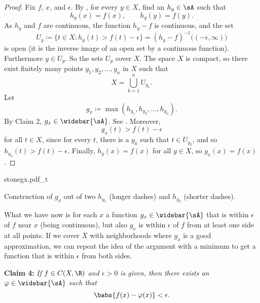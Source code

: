\begin{proof}
Fix $f$, $x$, and $\epsilon$.
By , for every $y \in X$, find an $h_y \in
\sA$ such that
\begin{equation*}
h_y(x) = f(x), \qquad h_y(y)=f(y) .
\end{equation*}
As $h_y$ and $f$ are continuous, the function $h_y-f$ is continuous,
and the set
\begin{equation*}
U_y \coloneqq
\bigl\{ t \in X : h_y(t) > f(t) -\epsilon \bigr\}
=
{(h_y-f)}^{-1} \bigl( (-\epsilon,\infty) \bigr)
\end{equation*}
is open (it is the inverse image of an open set by a continuous function).
Furthermore $y \in U_y$.  So the sets $U_y$ cover $X$.
The space $X$ is compact,
so there exist finitely many
points $y_1,y_2,\ldots,y_n$ in $X$ such
that
\begin{equation*}
X = \bigcup_{k=1}^n U_{y_k}  .
\end{equation*}
Let 
\begin{equation*}
g_x \coloneqq \max(h_{y_1},h_{y_2},\ldots,h_{y_n}) .
\end{equation*}
By Claim 2, $g_x \in \widebar{\sA}$.  See .
Moreover,
\begin{equation*}
g_x(t) > f(t) -\epsilon
\end{equation*}
for all $t \in X$, since for every $t$, there is a $y_k$ such that 
$t \in U_{y_k}$, and so 
$h_{y_k}(t) > f(t) -\epsilon$.
Finally, $h_y(x) = f(x)$ for all $y \in X$, so
$g_x(x) = f(x)$.
\end{proof}

\begin{myfigureht}
{stonegx.pdf_t}
\caption{Construction of $g_x$ out of two $h_{y_1}$ (longer dashes) and
$h_{y_2}$ (shorter dashes).\label{fig:stonegx}}
\end{myfigureht}

What we have now is for each $x$ a function $g_x \in \widebar{\sA}$
that is within $\epsilon$ of $f$ near $x$ (being continuous),
but also $g_x$ is within $\epsilon$ of $f$ from at least one side at
all points.
If we cover $X$ with neighborhoods where $g_x$ is a good approximation,
we can repeat the idea of the argument with a minimum to get
a function that is within $\epsilon$ from both sides.

\medskip
\pagebreak[2]

\noindent
\textbf{Claim 4:} \emph{If $f \in C(X,\R)$ and $\epsilon > 0$ is given, then there
exists an $\varphi \in \widebar{\sA}$ such that}
\begin{equation*}
\babs{f(x) - \varphi(x)} < \epsilon .
\end{equation*}

